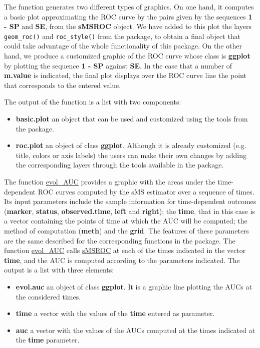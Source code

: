 The function generates two different types of graphics. On one hand, it computes a basic plot approximating the ROC curve by the pairs given by the sequences {\textbf{1 - SP}} and {\textbf{SE}}, from the {\textbf{sMSROC}} object. We have added to this plot the layers {\texttt{geom\_roc()}} and {\texttt{roc\_style()}} from the    package, to obtain a final object that could take advantage of the whole functionality of this package. On the other hand, we produce a customized graphic of the ROC curve whose class is {\textbf{ggplot}} by plotting the sequence {\textbf{1 - SP}} against {\textbf{SE}}. In the case that a number of {\textbf{m.value}} is indicated, the final plot displays over the ROC curve line the point that corresponds to the entered value.

The output of the function is a list with two components:
\begin{itemize}
\item{\textbf{basic.plot}} {an object that can be used and customized using the tools from the   package.} 
\item{\textbf{roc.plot}} {an object of class {\textbf{ggplot}}. Although it is already customized (e.g. title, colors or axis labels) the users can make their own changes by adding the corresponding layers through the tools available in the   package.}
\end{itemize}
The function {\url{evol\_AUC}} provides a graphic with the areas under the time-dependent ROC curves computed by the sMS estimator over a sequence of times. Its input parameters include the sample information for time-dependent outcomes ({\textbf{marker}}, {\textbf{status}}, {\textbf{observed.time}}, {\textbf{left}} and {\textbf{right}}); the {\textbf{time}}, that in this case is a vector containing the points of time at which the AUC will be computed; the method of computation ({\textbf{meth}}) and the {\textbf{grid}}. The features of these parameters are the same  described for the corresponding functions in the package. The function \url {evol\_AUC} calls \url{sMSROC} at each of the times indicated in the vector {\textbf{time}}, and the AUC is computed according to the parameters indicated. The output is a list with three elements:
\begin{itemize}
\item{\textbf{evol.auc}} {an object of class {\textbf{ggplot}}. It is a graphic line plotting the AUCs at the considered times.} 
\item{\textbf{time}} {a vector with the values of the {\textbf{time}} entered as parameter.}
\item{\textbf{auc}} {a vector with the values of the AUCs computed at the times indicated at the {\textbf{time}} parameter.}
\end{itemize}
